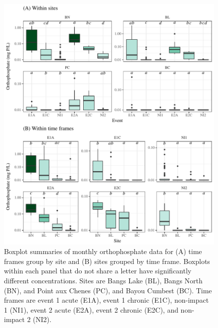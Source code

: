 \documentclass[letterpaper,12pt]{article}\usepackage[]{graphicx}\usepackage[]{color}
\makeatletter
\def\maxwidth{ %
  \ifdim\Gin@nat@width>\linewidth
    \linewidth
  \else
    \Gin@nat@width
  \fi
}
\makeatother
\begin{document}
\begin{figure}[!ht]

{\centering \includegraphics[width=\maxwidth]{figs/Fig6} 

}

\caption[Boxplot summaries of monthly orthophosphate data for (A) time frames group by site and (B) sites grouped by time frame]{Boxplot summaries of monthly orthophosphate data for (A) time frames group by site and (B) sites grouped by time frame. Boxplots within each panel that do not share a letter have significantly different concentrations. Sites are Bangs Lake (BL), Bangs North (BN), and Point aux Chenes (PC), and Bayou Cumbest (BC).  Time frames are event 1 acute (E1A), event 1 chronic (E1C), non-impact 1 (NI1), event 2 acute (E2A), event 2 chronic (E2C), and non-impact 2 (NI2).}\label{fig:Fig6}
\end{figure}



\clearpage

\end{document}
